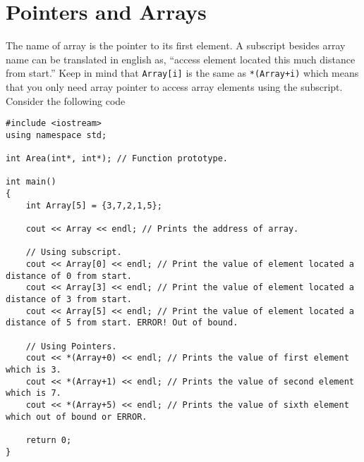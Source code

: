 \documentclass[12pt,a4paper]{article}
\begin{document}
\section{Pointers and Arrays}
The name of array is the pointer to its first element. A subscript besides array name can be translated in english as, ``access element located this much distance from start.'' Keep in mind that \verb|Array[i]| is the same as \verb|*(Array+i)| which means that you only need array pointer to access array elements using the subscript. Consider the following code
\begin{lstlisting}[caption={Arrays and Pointers}]
#include <iostream>
using namespace std;

int Area(int*, int*); // Function prototype.

int main()
{
	int Array[5] = {3,7,2,1,5};

	cout << Array << endl; // Prints the address of array.

	// Using subscript.
	cout << Array[0] << endl; // Print the value of element located a distance of 0 from start.
	cout << Array[3] << endl; // Print the value of element located a distance of 3 from start.
	cout << Array[5] << endl; // Print the value of element located a distance of 5 from start. ERROR! Out of bound.

	// Using Pointers.
	cout << *(Array+0) << endl; // Prints the value of first element which is 3.
	cout << *(Array+1) << endl; // Prints the value of second element which is 7.
	cout << *(Array+5) << endl; // Prints the value of sixth element which out of bound or ERROR.

	return 0;
}
\end{lstlisting}
\end{document}
